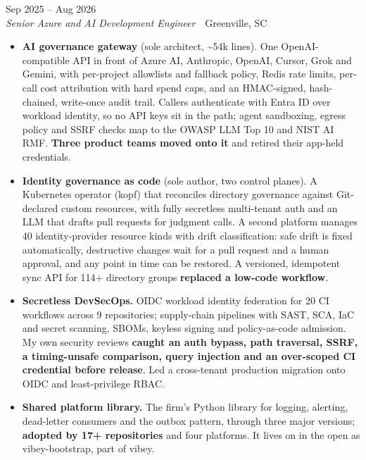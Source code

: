 \documentclass[10pt,letterpaper]{article}
\newcommand{\szmeta}{\fontsize{8pt}{10pt}\selectfont}
\begin{document}
\vspace{3pt}
 \hfill {\color{muted}\szmeta Sep 2025 – Aug 2026}\\[1pt]
{\itshape Senior Azure and AI Development Engineer}{\color{muted}\ \textbullet\ Greenville, SC}
\vspace{2pt}
\begin{itemize}
\item \textbf{AI governance gateway} {\color{muted}(sole architect, \textasciitilde{}54k lines)}. One OpenAI-compatible API in front of Azure AI, Anthropic, OpenAI, Cursor, Grok and Gemini, with per-project allowlists and fallback policy, Redis rate limits, per-call cost attribution with hard spend caps, and an HMAC-signed, hash-chained, write-once audit trail. Callers authenticate with Entra ID over workload identity, so no API keys sit in the path; agent sandboxing, egress policy and SSRF checks map to the OWASP LLM Top 10 and NIST AI RMF. \textbf{Three product teams moved onto it} and retired their app-held credentials.
\item \textbf{Identity governance as code} {\color{muted}(sole author, two control planes)}. A Kubernetes operator (kopf) that reconciles directory governance against Git-declared custom resources, with fully secretless multi-tenant auth and an LLM that drafts pull requests for judgment calls. A second platform manages 40 identity-provider resource kinds with drift classification: safe drift is fixed automatically, destructive changes wait for a pull request and a human approval, and any point in time can be restored. A versioned, idempotent sync API for 114+ directory groups \textbf{replaced a low-code workflow}.
\item \textbf{Secretless DevSecOps.} OIDC workload identity federation for 20 CI workflows across 9 repositories; supply-chain pipelines with SAST, SCA, IaC and secret scanning, SBOMs, keyless signing and policy-as-code admission. My own security reviews \textbf{caught an auth bypass, path traversal, SSRF, a timing-unsafe comparison, query injection and an over-scoped CI credential before release}. Led a cross-tenant production migration onto OIDC and least-privilege RBAC.
\item \textbf{Shared platform library.} The firm's Python library for logging, alerting, dead-letter consumers and the outbox pattern, through three major versions; \textbf{adopted by 17+ repositories} and four platforms. It lives on in the open as vibey-bootstrap, part of vibey.
\end{itemize}
\end{document}
